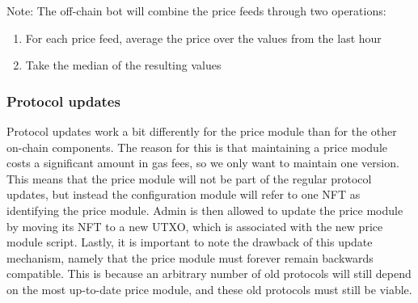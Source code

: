\documentclass{article} %
\begin{document}
Note: The off-chain bot will combine the price feeds through two operations:
\begin{enumerate}
  \item For each price feed, average the price over the values from the last
    hour
  \item Take the median of the resulting values
\end{enumerate}

\subsubsection*{Protocol updates}

Protocol updates work a bit differently for the price module than for the other
on-chain components.
The reason for this is that maintaining a price module costs a significant
amount in gas fees, so we only want to maintain one version.
This means that the price module will not be part of the regular protocol
updates, but instead the configuration module will refer to one NFT as
identifying the price module.
Admin is then allowed to update the price module by moving its NFT to a new
UTXO, which is associated with the new price module script.
Lastly, it is important to note the drawback of this update mechanism, namely
that the price module must forever remain backwards compatible.
This is because an arbitrary number of old protocols will still depend on the
most up-to-date price module, and these old protocols must still be viable.

% 
% 
% 
% 
% 
% 
\end{document}
